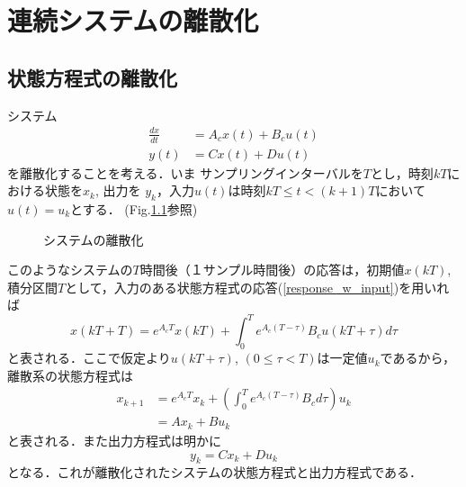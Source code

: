 \chapter{連続システムの離散化}
\section{状態方程式の離散化}
システム
\begin{align}
 \frac{dx}{dt} &= A_c x(t) + B_c u(t) \label{c_state_eq} \\
 y(t)          &= C x(t) + D u(t) \label{c_output_eq}
\end{align}
を離散化することを考える．いま
サンプリングインターバルを$T$とし，時刻$kT$における状態を$x_k$, 出力を
$y_k$，入力$u(t)$は時刻$kT \leq t < (k+1)T$において$u(t) = u_k$とする．
(Fig.\ref{fig_discrete_signal}参照)

\begin{figure}[htbp]
 \begin{center}
  \caption{システムの離散化}
  \label{fig_discrete_signal}
 \end{center}
\end{figure}
\newpage

このようなシステムの$T$時間後（１サンプル時間後）の応答は，初期値$x(kT)$,積分区間$T$として，入力のある状態方程式の応答(\ref{response_w_input})を用いれば
\begin{equation}
 x(kT+T) = e^{A_c T} x(kT) 
  + \int_0^T e^{A_c(T - \tau)}B_c u (kT + \tau) d \tau
\end{equation}
と表される．ここで仮定より$u(kT+\tau)$, $(0\leq\tau<T)$は一定値$u_k$であるから，離散系の状態方程式は
\begin{align}
 x_{k+1} &= e^{A_cT} x_k 
  + \left( \int_0^T e^{A_c(T-\tau)} B_c d \tau \right) u_k \nonumber \\
 &= A x_k + B u_k
\end{align}
と表される．また出力方程式は明かに
\begin{equation}
 y_k = C x_k + D u_k 
\end{equation}
となる．これが離散化されたシステムの状態方程式と出力方程式である．

